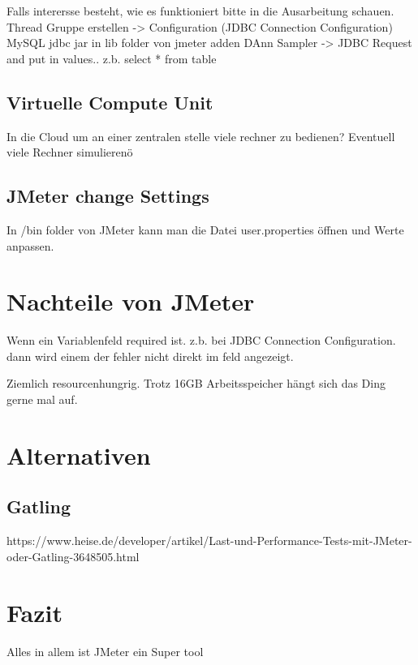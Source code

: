 \documentclass[a4paper,12pt]{article}
\begin{document}
Falls interersse besteht, wie es funktioniert bitte in die Ausarbeitung schauen.
Thread Gruppe erstellen -> Configuration (JDBC Connection Configuration)
MySQL jdbc jar in lib folder von jmeter adden 
DAnn Sampler -> JDBC Request and put in values.. z.b. select * from table


\subsection{Virtuelle Compute Unit}
In die Cloud um an einer zentralen stelle viele rechner zu bedienen?
Eventuell viele Rechner simulierenö

\subsection{JMeter change Settings}
In /bin folder von JMeter kann man die Datei user.properties öffnen und Werte anpassen.

\section{Nachteile von JMeter}
Wenn ein Variablenfeld required ist. z.b. bei JDBC Connection Configuration. dann wird einem der fehler nicht direkt im feld angezeigt.

Ziemlich resourcenhungrig. Trotz 16GB Arbeitsspeicher hängt sich das Ding gerne mal auf.

\section{Alternativen}
\subsection{Gatling}
https://www.heise.de/developer/artikel/Last-und-Performance-Tests-mit-JMeter-oder-Gatling-3648505.html

\section{Fazit}
Alles in allem ist JMeter ein Super tool

\pagebreak
\thispagestyle{empty}


\end{document}
